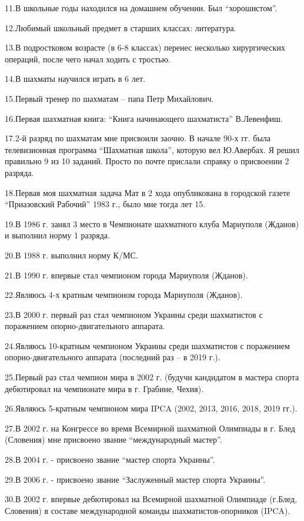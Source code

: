 11.В школьные годы находился на домашнем обучении. Был \enquote{хорошистом}.  

12.Любимый школьный предмет в старших классах: литература.

13.В подростковом возрасте (в 6-8 классах) перенес несколько хирургических
операций, после чего начал ходить с тростью.

14.В шахматы научился играть в 6 лет.

15.Первый тренер по шахматам – папа Петр Михайлович.

16.Первая шахматная книга: \enquote{Книга начинающего шахматиста} В.Левенфиш.

17.2-й разряд по шахматам мне присвоили заочно. В начале 90-х гг. была
телевизионная программа \enquote{Шахматная школа}, которую вел Ю.Авербах. Я решил
правильно 9 из 10 заданий. Просто по почте прислали справку о присвоении 2
разряда.

18.Первая моя шахматная задача Мат в 2 хода опубликована в городской газете
\enquote{Приазовский Рабочий} 1983 г., было мне тогда лет 15.

19.В 1986 г. занял 3 место в Чемпионате шахматного клуба Мариуполя (Жданов) и
выполнил норму 1 разряда.

20.В 1988 г. выполнил норму К/МС. 

21.В 1990 г. впервые стал чемпионом города Мариуполя (Жданов).

22.Являюсь 4-х кратным чемпионом города Мариуполя (Жданов).

23.В 2000 г. первый раз стал чемпионом Украины среди шахматистов с поражением
опорно-двигательного аппарата. 

24.Являюсь 10-кратным чемпионом Украины среди шахматистов с поражением
опорно-двигательного аппарата (последний раз – в 2019 г.).

25.Первый раз стал чемпион мира в 2002 г. (будучи кандидатом в мастера спорта
дебютировал на чемпионате мира в г. Грабине, Чехия).

26.Являюсь 5-кратным чемпионом мира IPCA (2002, 2013, 2016, 2018, 2019 гг.).

27.В 2002 г. на Конгрессе во время Всемирной шахматной Олимпиады в г. Блед
(Словения) мне присвоено звание \enquote{международный мастер}.  

28.В 2004 г. - присвоено звание \enquote{мастер спорта Украины}.

29.В 2006 г. - присвоено звание \enquote{Заслуженный мастер спорта Украины}.

30.В 2002 г. впервые дебютировал на Всемирной шахматной Олимпиаде  (г.Блед,
Словения) в составе международной команды шахматистов-опорников (IPCA).

